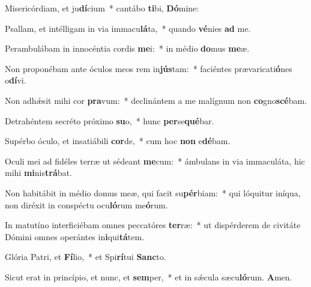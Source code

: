 \item Misericórdiam, et ju\textbf{dí}cium~* cantábo \textbf{ti}bi, \textbf{Dó}mine:

\item Psallam, et intélligam in via immacu\textbf{lá}ta,~* quando \textbf{vé}nies \textbf{ad} me.

\item Perambulábam in innocéntia cordis \textbf{me}i:~* in médio \textbf{do}mus \textbf{me}æ.

\item Non proponébam ante óculos meos rem in\textbf{jús}tam:~* faciéntes prævaricati\textbf{ó}nes o\textbf{dí}vi.

\item Non adhǽsit mihi cor \textbf{pra}vum:~* declinántem a me malígnum non \textbf{co}gno\textbf{scé}bam.

\item Detrahéntem secréto próximo \textbf{su}o,~* hunc \textbf{per}se\textbf{qué}bar.

\item Supérbo óculo, et insatiábili \textbf{cor}de,~* cum hoc \textbf{non} e\textbf{dé}bam.

\item Oculi mei ad fidéles terræ ut sédeant \textbf{me}cum:~* ámbulans in via immaculáta, hic mihi \textbf{mi}nis\textbf{trá}bat.

\item Non habitábit in médio domus meæ, qui facit su\textbf{pér}biam:~* qui lóquitur iníqua, non diréxit in conspéctu ocu\textbf{ló}rum me\textbf{ó}rum.

\item In matutíno interficiébam omnes peccatóres \textbf{ter}ræ:~* ut dispérderem de civitáte Dómini omnes operántes in\textbf{i}qui\textbf{tá}tem.

\item Glória Patri, et \textbf{Fí}lio,~* et Spi\textbf{rí}tui \textbf{Sanc}to.

\item Sicut erat in princípio, et nunc, et \textbf{sem}per,~* et in sǽcula sæcu\textbf{ló}rum. \textbf{A}men.
